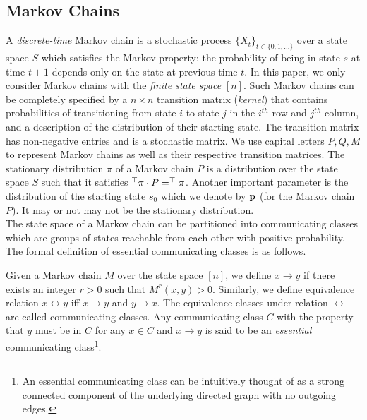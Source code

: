 
\subsection{Markov Chains}
A {\em discrete-time} Markov chain is a stochastic process $\{X_t\}_{t \in \{0,1,\ldots \}}$ over a state space $S$ which satisfies the Markov property: 
the probability of being in state $s$ at time $t+1$ depends only on the state at previous time $t$. In this paper, we
only consider Markov chains with the {\em finite state space} $[n]$. Such Markov chains can be completely specified 
by a $n \times n$ transition matrix (\emph{kernel}) that contains probabilities of transitioning from state $i$ to state $j$ 
in the $i^{th}$ row and $j^{th}$ column, and a description of the distribution of their starting state. The transition matrix has non-negative entries and is a stochastic matrix. We use capital letters $P,Q,M$ to represent Markov 
chains as well as their respective transition matrices. The stationary distribution $\pi$ of a Markov chain $P$ is a distribution over the state space $S$ such that it satisfies $^{\top}{\pi}\cdot P = ^{\top}{\pi}$. 
Another important parameter is the distribution of the starting state $s_0$ which we denote by $\mathbf{p}$ (for the Markov chain $P$). It may or not may not be the stationary distribution.\\
The state space of a Markov chain can be partitioned into communicating classes which are groups of states reachable from each other with positive probability.
The formal definition of essential communicating classes is as follows.
\begin{definition}
	\label{def:comm-class}
Given a Markov chain $M$ over the state space $[n]$, we define $x \rightarrow y$ if there exists an integer $r>0$ such that $M^r(x,y) > 0$. Similarly, we define equivalence relation 
$x \leftrightarrow y$ iff $x \rightarrow y$ and $y \rightarrow x$. The equivalence classes under relation $\leftrightarrow$ are called communicating classes. Any communicating class $C$ with the property 
that $y$ must be in $C$ for any $x\in C$ and $x \rightarrow y$ is said to be an {\em essential} communicating class\footnote{An essential communicating class can be intuitively thought of as a strong connected component of the underlying directed graph with no outgoing edges.}.
\end{definition}

